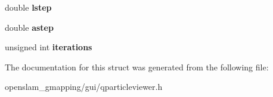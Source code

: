 \begin{DoxyCompactItemize}
double {\bfseries lstep}
\item 
\mbox{\label{structGMapping_1_1QParticleViewer_1_1MatchingParameters_a877a63cbaa7188a4d64fc994273209bd}} 
double {\bfseries astep}
\item 
\mbox{\label{structGMapping_1_1QParticleViewer_1_1MatchingParameters_a77581760f7ee7bf358c7ae9ade17123e}} 
unsigned int {\bfseries iterations}
\end{DoxyCompactItemize}


The documentation for this struct was generated from the following file\+:\begin{DoxyCompactItemize}
\item 
openslam\+\_\+gmapping/gui/qparticleviewer.\+h\end{DoxyCompactItemize}
